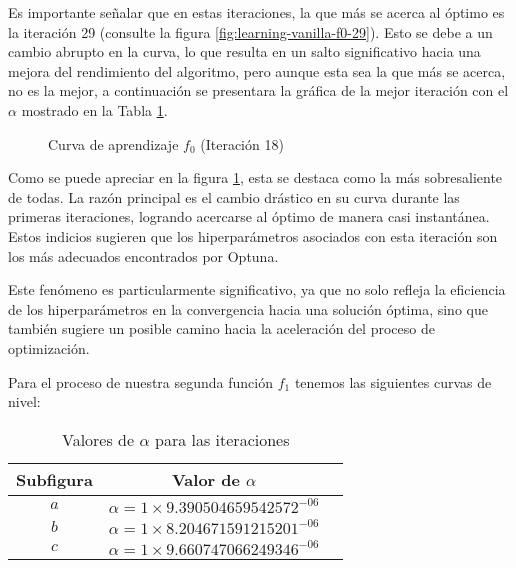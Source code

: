 Es importante señalar que en estas iteraciones, la que más se acerca al óptimo es la iteración 29 (consulte la figura \ref{fig:learning-vanilla-f0-29}). Esto se debe a un cambio abrupto en la curva, lo que resulta en un salto significativo hacia una mejora del rendimiento del algoritmo, pero aunque esta sea la que más se acerca, no es la mejor, a continuación se presentara la gráfica de la mejor iteración con el $\alpha$ mostrado en la Tabla \ref{tab:valores-alpha-vanilla}.

\clearpage

\begin{figure}[h!]
  \centering
    
  \caption{Curva de aprendizaje $f_0$ (Iteración 18)}
  \captionsetup{justification=centering}
  \label{fig:learning-vanilla-f0-18}
\end{figure}

Como se puede apreciar en la figura \ref{fig:learning-vanilla-f0-18}, esta se destaca como la más sobresaliente de todas. La razón principal es el cambio drástico en su curva durante las primeras iteraciones, logrando acercarse al óptimo de manera casi instantánea. Estos indicios sugieren que los hiperparámetros asociados con esta iteración son los más adecuados encontrados por Optuna.

Este fenómeno es particularmente significativo, ya que no solo refleja la eficiencia de los hiperparámetros en la convergencia hacia una solución óptima, sino que también sugiere un posible camino hacia la aceleración del proceso de optimización.

\newpage

Para el proceso de nuestra segunda función $f_1$ tenemos las siguientes curvas de nivel:
\begin{table}[H]
    \centering
    \caption{Valores de $\alpha$ para las iteraciones}
    \begin{tabular}{|c|c|c|}
    \hline
    \textbf{Subfigura} & \textbf{Valor de $\alpha$} \\
    \hline
    $a$ & $\alpha = 1 \times 9.390504659542572^{-06}$ \\
    \hline
    $b$ & $\alpha = 1 \times 8.204671591215201^{-06} $ \\
    \hline
    $c$ & $\alpha = 1 \times 9.660747066249346^{-06}$ \\
    \hline
    \end{tabular}
    \label{tab:valores-alpha-vanilla}
\end{table}

